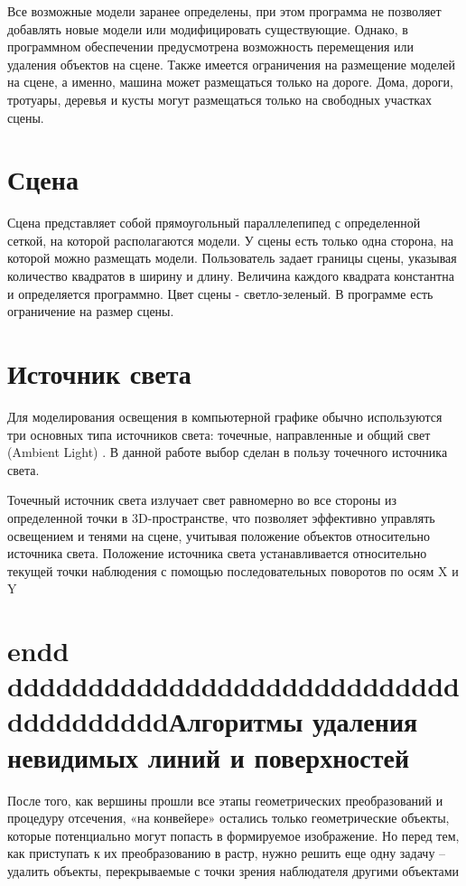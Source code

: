 Все возможные модели заранее определены, при этом программа не позволяет добавлять новые модели или модифицировать существующие. Однако, в программном обеспечении предусмотрена возможность перемещения или удаления объектов на сцене. Также имеется ограничения на размещение моделей на сцене, а именно, машина может размещаться только на дороге. Дома, дороги, тротуары, деревья и кусты могут размещаться только на свободных участках сцены.

\section*{Сцена}
	Сцена представляет собой прямоугольный параллелепипед с определенной сеткой, на которой располагаются модели. У сцены есть только одна сторона, на которой можно размещать модели. Пользователь задает границы сцены, указывая количество квадратов в ширину и длину. Величина каждого квадрата константна и определяется программно. Цвет сцены - светло-зеленый. В программе есть ограничение на размер сцены.


\section*{Источник света}

Для моделирования освещения в компьютерной графике обычно используются три основных типа источников света: точечные, направленные и общий свет (Ambient Light) \cite{light}. В данной работе выбор сделан в пользу точечного источника света.

Точечный источник света излучает свет равномерно во все стороны из определенной точки в 3D-пространстве, что позволяет эффективно управлять освещением и тенями на сцене, учитывая положение объектов относительно источника света. Положение источника света устанавливается относительно текущей точки наблюдения с помощью последовательных поворотов по осям X и Y \cite{light}






\section{ endd ddddddddddddddddddddddddddddddddddddddАлгоритмы удаления невидимых линий и поверхностей}

После того, как вершины прошли все этапы геометрических преобразований и процедуру
отсечения, «на конвейере» остались только геометрические объекты, которые потенциально могут
попасть в формируемое изображение. Но перед тем, как приступать к их преобразованию в растр,
нужно решить еще одну задачу – удалить объекты, перекрываемые с точки зрения наблюдателя
другими объектами 


